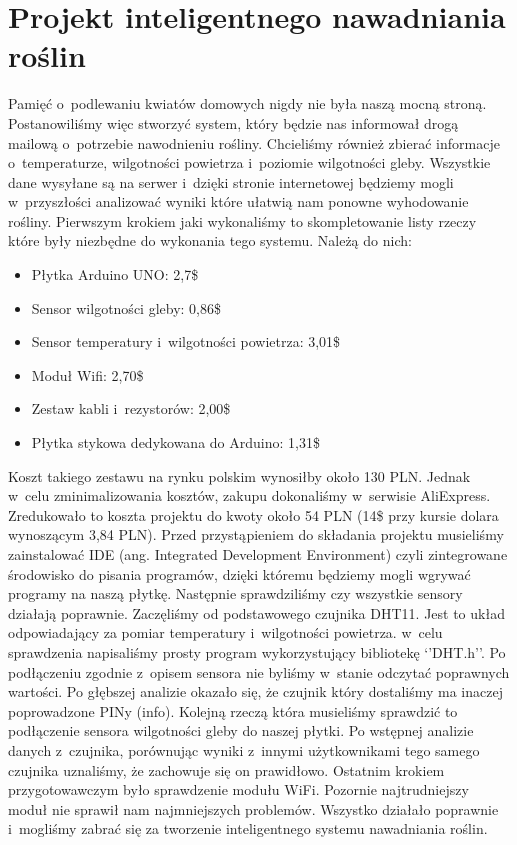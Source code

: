 \documentclass{xmgr}
\begin{document}
\section{Projekt inteligentnego nawadniania roślin}
	Pamięć o~podlewaniu kwiatów domowych nigdy nie była naszą mocną stroną. Postanowiliśmy więc stworzyć system, który będzie nas informował drogą mailową o~potrzebie nawodnieniu rośliny. Chcieliśmy również zbierać informacje o~temperaturze, wilgotności powietrza i~poziomie wilgotności gleby. Wszystkie dane wysyłane są na serwer i~dzięki stronie internetowej będziemy mogli w~przyszłości analizować wyniki które ułatwią nam ponowne wyhodowanie rośliny. 
	Pierwszym krokiem jaki wykonaliśmy to skompletowanie listy rzeczy które były niezbędne do wykonania tego systemu. Należą do nich: 
\begin{itemize}
\item Płytka Arduino UNO: 2,7\$
\item Sensor wilgotności gleby: 0,86\$
\item Sensor temperatury i~wilgotności powietrza: 3,01\$
\item Moduł Wifi: 2,70\$
\item Zestaw kabli i~rezystorów: 2,00\$
\item Płytka stykowa dedykowana do Arduino: 1,31\$
\end{itemize}
	Koszt takiego zestawu na rynku polskim wynosiłby około 130 PLN. Jednak w~celu zminimalizowania kosztów, zakupu dokonaliśmy w~serwisie AliExpress. Zredukowało to koszta  projektu do kwoty około 54 PLN (14\$ przy kursie dolara wynoszącym 3,84 PLN).
	Przed przystąpieniem do składania projektu musieliśmy zainstalować IDE (ang. Integrated Development Environment) czyli zintegrowane środowisko do pisania programów, dzięki któremu będziemy mogli wgrywać programy na naszą płytkę. Następnie sprawdziliśmy czy wszystkie sensory działają poprawnie. Zaczęliśmy od podstawowego czujnika DHT11. Jest to układ odpowiadający za pomiar temperatury i~wilgotności powietrza. w~celu sprawdzenia napisaliśmy prosty program wykorzystujący bibliotekę ‘’DHT.h’’. Po podłączeniu zgodnie z~opisem sensora nie byliśmy w~stanie odczytać poprawnych wartości. Po głębszej analizie okazało się, że czujnik który dostaliśmy ma inaczej poprowadzone PINy (info). Kolejną rzeczą która musieliśmy sprawdzić to podłączenie sensora wilgotności gleby do naszej płytki. Po wstępnej analizie danych z~czujnika, porównując wyniki z~innymi użytkownikami tego samego czujnika uznaliśmy, że zachowuje się on prawidłowo. Ostatnim krokiem przygotowawczym było sprawdzenie modułu WiFi. Pozornie najtrudniejszy moduł nie sprawił nam najmniejszych problemów. Wszystko działało poprawnie i~mogliśmy zabrać się za tworzenie inteligentnego systemu nawadniania roślin.
\end{document}
